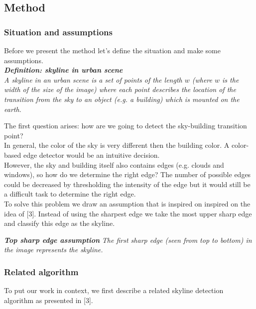 \subsection{Method} %
\subsubsection{Situation and assumptions}
Before we present the method let's define the situation and make some
assumptions.\\

\textbf{\emph{Definition: skyline in urban scene}}\\
\emph{A skyline in an urban scene is a set of points of the length $w$ (where $w$ is the
width of the size of the image) where each point describes the location of the
transition from the sky to an object (e.g. a building) which is mounted on the
earth.}

The first question arises: how are we going to detect the sky-building
transition point?\\ In general, the color of the sky is very different then the building color. A
color-based edge detector would be an intuitive decision.\\
However, the sky and building itself also contains edges (e.g. clouds and 
windows), so how do we determine the right edge?
The number of possible edges could be decreased by thresholding the intensity of
the edge but it would still be a difficult task to determine the right edge.\\


To solve this problem we draw an assumption that is inspired on inspired on the
idea of [3]. Instead of using the sharpest edge we take the most upper sharp
edge and classify this edge as the skyline.

\textbf{\emph{Top sharp edge assumption}}
\emph{The first sharp edge (seen from top to bottom) in the image 
represents the skyline.}




\subsubsection{Related algorithm}
To put our work in context, we first describe a related skyline detection algorithm as presented in [3].\\

